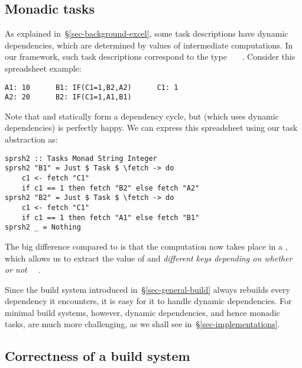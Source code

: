 \subsection{Monadic tasks}\label{sec-task-monad}

As explained in~\S\ref{sec-background-excel}, some task descriptions have
dynamic dependencies, which are determined by values of intermediate
computations. In our framework, such task descriptions correspond to the type
~~~. Consider this spreadsheet example:

\vspace{1mm}
\begin{verbatim}
A1: 10      B1: IF(C1=1,B2,A2)      C1: 1
A2: 20      B2: IF(C1=1,A1,B1)
\end{verbatim}

\noindent
Note that  and  statically form a dependency cycle, but \Excel
(which uses dynamic dependencies) is perfectly happy. We can express this
spreadsheet using our task abstraction as:


\vspace{1mm}
\begin{verbatim}
sprsh2 :: Tasks Monad String Integer
sprsh2 "B1" = Just $ Task $ \fetch -> do
    c1 <- fetch "C1"
    if c1 == 1 then fetch "B2" else fetch "A2"
sprsh2 "B2" = Just $ Task $ \fetch -> do
    c1 <- fetch "C1"
    if c1 == 1 then fetch "A1" else fetch "B1"
sprsh2 _ = Nothing
\end{verbatim}
\vspace{1mm}

\noindent
The big difference compared to  is that the computation now takes
place in a , which allows us to extract the value of  and
 \emph{different keys depending on whether or not ~\hs{==}~}.

Since the  build system introduced in~\S\ref{sec-general-build} always
rebuilds every dependency it encounters, it is easy for it to handle dynamic
dependencies. For minimal build systems, however, dynamic dependencies, and hence
monadic tasks, are much more challenging, as we shall see
in~\S\ref{sec-implementations}.

\subsection{Correctness of a build system} \label{sec-build-correctness}


